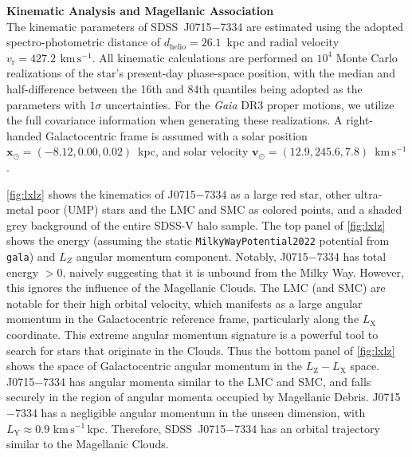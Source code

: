 \documentclass{natureprintstyle}
\newcommand{\code}[1]{\texttt{#1}\xspace}
\newcommand{\unit}[1]{\ensuremath{\mathrm{\,#1}}\xspace}
\newcommand{\kms}{\unit{km\,s^{-1}}}
\newcommand{\umpstarsdss}{SDSS~J0715$-$7334\xspace}
\newcommand{\umpstar}{J0715$-$7334\xspace}
\begin{document}
\vspace{1mm}
\noindent
{\bf Kinematic Analysis and Magellanic Association}
\\
\noindent
The kinematic parameters of \umpstarsdss{} are estimated using the adopted spectro-photometric distance of $d_\mathrm{helio} = 26.1$~kpc and radial velocity $v_\mathrm{r} = 427.2~\kms$. 
All kinematic calculations are performed on $10^4$ Monte Carlo realizations of the  star's present-day phase-space position, with the median and half-difference between the 16th and 84th quantiles being adopted as the parameters with $1\sigma$ uncertainties. 
For the \textit{Gaia} DR3 proper motions, we utilize the full covariance information when generating these realizations. 
A right-handed Galactocentric frame is assumed with a solar position $\mathbf{x}_\odot = (-8.12, 0.00, 0.02)$~kpc, and solar velocity $\mathbf{v}_\odot = (12.9, 245.6, 7.8)$~$\mathrm{km\,s^{-1}}$ \cite{Reid2004,Drimmel2018,GravityCollaboration2019}. 

\ref{fig:lxlz} shows the kinematics of \umpstar as a large red star, other ultra-metal poor (UMP) stars and the LMC and SMC as colored points, and a shaded grey background of the entire SDSS-V halo sample\cite{Chandra2025}.
The top panel of \ref{fig:lxlz} shows the energy (assuming the static \code{MilkyWayPotential2022} potential from {\code{gala}}\cite{gala}) and $L_Z$ angular momentum component. Notably, \umpstar has total energy $> 0$, naively suggesting that it is unbound from the Milky Way. However, this ignores the influence of the Magellanic Clouds. 
% 
The LMC (and SMC) are notable for their high orbital velocity, which manifests as a large angular momentum in the Galactocentric reference frame, particularly along the $L_\mathrm{X}$ coordinate. 
This extreme angular momentum signature is a powerful tool to search for stars that originate in the Clouds\cite{Chandra2023b}.
Thus the bottom panel of \ref{fig:lxlz} shows the space of Galactocentric angular momentum in the $L_\mathrm{Z}-L_\mathrm{X}$ space. 
\umpstar has angular momenta similar to the LMC and SMC, and falls securely in the region of angular momenta occupied by Magellanic Debris.
\umpstar has a negligible angular momentum in the unseen dimension, with $L_\mathrm{Y} \approx 0.9\,\kms$\,kpc. 
Therefore, \umpstarsdss{} has an orbital trajectory similar to the Magellanic Clouds. 
\end{document}
